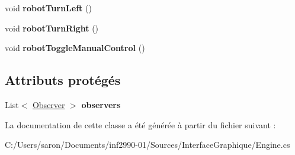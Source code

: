\begin{DoxyCompactItemize}
\item 
\hypertarget{class_interface_graphique_1_1_engine_a8cdac374ca861f54ebb70a58da85423d}{void {\bfseries robot\-Turn\-Left} ()}\label{class_interface_graphique_1_1_engine_a8cdac374ca861f54ebb70a58da85423d}

\item 
\hypertarget{class_interface_graphique_1_1_engine_a237f55d615628251be75528c09a6276c}{void {\bfseries robot\-Turn\-Right} ()}\label{class_interface_graphique_1_1_engine_a237f55d615628251be75528c09a6276c}

\item 
\hypertarget{class_interface_graphique_1_1_engine_aa028ac9b0a8b0f0b869a3065d22e9488}{void {\bfseries robot\-Toggle\-Manual\-Control} ()}\label{class_interface_graphique_1_1_engine_aa028ac9b0a8b0f0b869a3065d22e9488}

\end{DoxyCompactItemize}
\subsection*{Attributs protégés}
\begin{DoxyCompactItemize}
\item 
\hypertarget{class_interface_graphique_1_1_engine_a637816e50122a2ce73b5b16e0cc6909f}{List$<$ \hyperlink{interface_interface_graphique_1_1_observer}{Observer} $>$ {\bfseries observers}}\label{class_interface_graphique_1_1_engine_a637816e50122a2ce73b5b16e0cc6909f}

\end{DoxyCompactItemize}


La documentation de cette classe a été générée à partir du fichier suivant \-:\begin{DoxyCompactItemize}
\item 
C\-:/\-Users/saron/\-Documents/inf2990-\/01/\-Sources/\-Interface\-Graphique/Engine.\-cs\end{DoxyCompactItemize}

